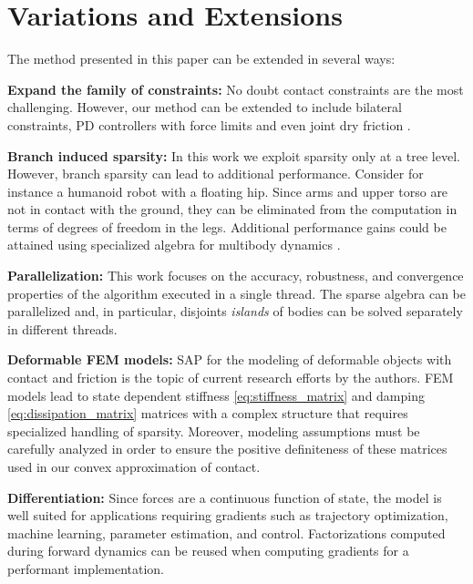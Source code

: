 \section{Variations and Extensions}
\label{sec:variations_and_extensions}

The method presented in this paper can be extended in several ways:

\textbf{Expand the family of constraints:} No doubt contact constraints are the
most challenging. However, our method can be extended to include bilateral
constraints, PD controllers with force limits and even joint dry friction
\cite{bib:todorov2014}.

\textbf{Branch induced sparsity:} In this work we exploit sparsity only at a
tree level. However, branch sparsity can lead to additional performance.
Consider for instance a humanoid robot with a floating hip. Since arms and upper
torso are not in contact with the ground, they can be eliminated from the
computation in terms of degrees of freedom in the legs. Additional performance
gains could be attained using specialized algebra for multibody dynamics
\cite{bib:carpentier2021}.

\textbf{Parallelization:} This work focuses on the accuracy, robustness, and
convergence properties of the algorithm executed in a single thread. The sparse
algebra can be parallelized and, in particular, disjoints \emph{islands} of
bodies can be solved separately in different threads.

\textbf{Deformable FEM models:} SAP for the modeling of deformable objects with
contact and friction is the topic of current research efforts by the authors.
FEM models lead to state dependent stiffness \eqref{eq:stiffness_matrix} and
damping \eqref{eq:dissipation_matrix} matrices with a complex structure that
requires specialized handling of sparsity. Moreover, modeling assumptions must
be carefully analyzed in order to ensure the positive definiteness of these
matrices used in our convex approximation of contact.

\textbf{Differentiation:} Since forces are a continuous function of state, the
model is well suited for applications requiring gradients such as trajectory
optimization, machine learning, parameter estimation, and control.
Factorizations computed during forward dynamics can be reused when computing
gradients for a performant implementation.
